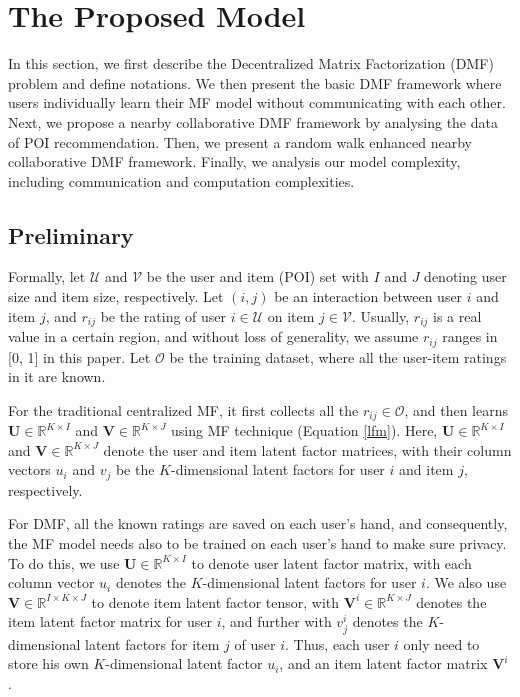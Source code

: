 \section{The Proposed Model}\label{model}
In this section, we first describe the Decentralized Matrix Factorization (DMF) problem and define notations. 
We then present the basic DMF framework where users individually learn their MF model without communicating with each other. 
Next, we propose a nearby collaborative DMF framework by analysing the data of POI recommendation. 
Then, we present a random walk enhanced nearby collaborative DMF framework. 
Finally, we analysis our model complexity, including communication and computation complexities.

\subsection{Preliminary}

Formally, let $\mathcal{U}$ and $\mathcal{V}$ be the user and item (POI) set with $I$ and $J$ denoting user size and item size, respectively. 
Let $(i,j)$ be an interaction between user $i$ and item $j$, and $r_{ij}$ be the rating of user $i \in \mathcal{U}$ on item $j \in \mathcal{V}$. 
Usually, $r_{ij}$ is a real value in a certain region, and without loss of generality, we assume $r_{ij}$ ranges in [0, 1] in this paper.
Let $\mathcal{O}$ be the training dataset, where all the user-item ratings in it are known. 

For the traditional centralized MF, it first collects all the $r_{ij} \in \mathcal{O}$, and then learns $\textbf{U}\in \mathbb{R}^{K\times{}I}$ and $\textbf{V}\in \mathbb{R}^{K\times{}J}$ using MF technique (Equation \ref{lfm}). 
Here, $\textbf{U}\in \mathbb{R}^{K\times{}I}$ and $\textbf{V}\in \mathbb{R}^{K\times{}J}$ denote the user and item latent factor matrices, with their column vectors $u_i$ and $v_j$ be the $K$-dimensional latent factors for user $i$ and item $j$, respectively.

For DMF, all the known ratings are saved on each user's hand, and consequently, the MF model needs also to be trained on each user's hand to make sure privacy. 
To do this, we use $\textbf{U}\in \mathbb{R}^{K\times{}I}$ to denote user latent factor matrix, with each column vector $u_i$ denotes the $K$-dimensional latent factors for user $i$. 
We also use $\textbf{V}\in \mathbb{R}^{I\times{}K\times{}J}$ to denote item latent factor tensor, with $\textbf{V}^i\in \mathbb{R}^{K\times{}J}$ denotes the item latent factor matrix for user $i$, and further with $v^i_j$ denotes the $K$-dimensional latent factors for item $j$ of user $i$. 
Thus, each user $i$ only need to store his own $K$-dimensional latent factor $u_i$, and an item latent factor matrix $\textbf{V}^i$.

